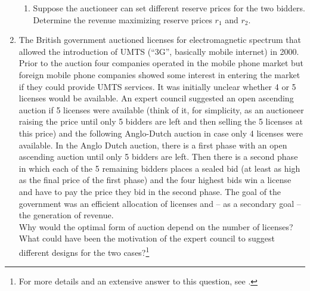 \documentclass[a4paper,12pt]{article}
\begin{document}
\begin{enumerate}[resume]
\begin{enumerate}
  \item Suppose the auctioneer can set different reserve prices for the two bidders. Determine the revenue maximizing reserve prices $r_1$ and $r_2$.
  \end{enumerate}
  \item The British government auctioned licenses for electromagnetic spectrum that allowed the introduction of UMTS (``3G'', basically mobile internet) in 2000. Prior to the auction four companies operated in the mobile phone market but foreign mobile phone companies showed some interest in entering the market if they could provide UMTS services. It was initially unclear whether 4 or 5 licenses would be available. An expert council suggested an open ascending auction if 5 licenses were available (think of it, for simplicity, as an auctioneer raising the price until only 5 bidders are left and then selling the 5 licenses at this price) and the following Anglo-Dutch auction in case only 4 licenses were available. In the Anglo Dutch auction, there is a first phase with an open ascending auction until only 5 bidders are left. Then there is a second phase in which each of the 5 remaining bidders places a sealed bid (at least as high as the final price of the first phase) and the four highest bids win a license and have to pay the price they bid in the second phase. The goal of the government was an efficient allocation of licenses and -- as a secondary goal -- the generation of revenue.\\
    Why would the optimal form of auction depend on the number of licenses? What could have been the motivation of the expert council to suggest different designs for the two cases?\footnote{For more details and an extensive answer to this question, see  \citet[ch. 6]{klemperer2004auctions}.}

\end{enumerate}
\end{document}
